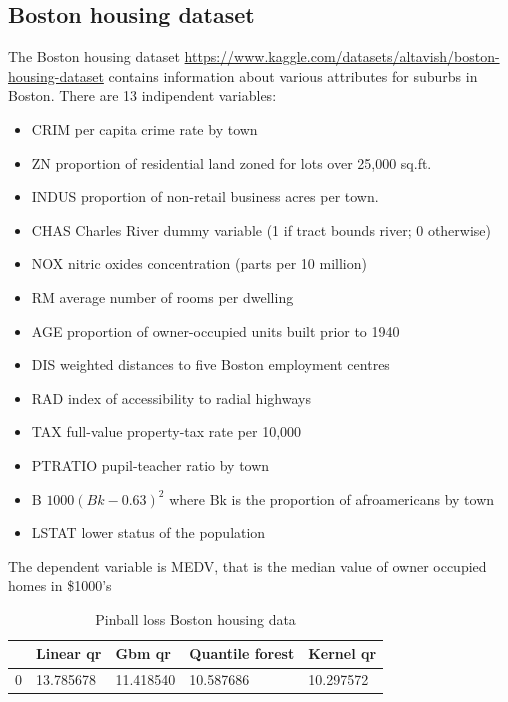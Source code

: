 \subsection{Boston housing dataset}
The Boston housing dataset \href{https://www.kaggle.com/datasets/altavish/boston-housing-dataset}{https://www.kaggle.com/datasets/altavish/boston-housing-dataset} contains information about various attributes for suburbs in Boston.
There are 13 indipendent variables:
\begin{itemize}
\item CRIM per capita crime rate by town
\item ZN proportion of residential land zoned for lots over 25,000 sq.ft.
\item INDUS proportion of non-retail business acres per town.
\item CHAS Charles River dummy variable (1 if tract bounds river; 0 otherwise)
\item NOX nitric oxides concentration (parts per 10 million)
\item RM average number of rooms per dwelling
\item AGE proportion of owner-occupied units built prior to 1940
\item DIS weighted distances to five Boston employment centres
\item RAD index of accessibility to radial highways
\item TAX full-value property-tax rate per 10,000
\item PTRATIO pupil-teacher ratio by town
\item B $1000(Bk - 0.63)^2$ where Bk is the proportion of afroamericans by town
\item LSTAT lower status of the population
\end{itemize}
The dependent variable is MEDV, that is the median value of owner occupied homes in \$1000's

\begin{table}
\caption{Pinball loss Boston housing data}
\begin{tabular}{lllll}
\toprule
    & Linear qr & Gbm qr & Quantile forest & Kernel qr \\
\midrule
0 & 13.785678 & 11.418540 & 10.587686 & 10.297572 \\
\bottomrule
\end{tabular}
\end{table}

